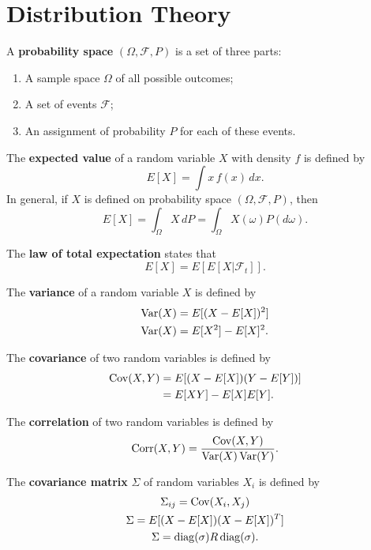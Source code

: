 \documentclass[10pt]{article}
\begin{document}
\section{Distribution Theory}

\begin{outline}
\1 A \textbf{probability space} $(\Omega, \mathscr{F}, P)$ is a set of three parts:
\begin{enumerate}
\item A sample space $\Omega$ of all possible outcomes;
\item A set of events $\mathscr{F}$;
\item An assignment of probability $P$ for each of these events.
\end{enumerate}

\1 The \textbf{expected value} of a random variable $X$ with density $f$ is defined by
\begin{equation*}
  E[X] = \int x\,f(x)\,dx.
\end{equation*}
In general, if $X$ is defined on probability space $(\Omega,\mathscr{F},P)$, then 
\begin{equation*}
  E[X] = \int_\Omega X\,dP = \int_\Omega X(\omega)P(d\omega).
\end{equation*}

\1 The \textbf{law of total expectation} states that
\begin{equation*}
  E[X] = E[E[X|\mathscr{F}_t]].
\end{equation*}

\1 The \textbf{variance} of a random variable $X$ is defined by
\begin{align*}
  \operatorname{Var}(X) &= E[(X-E[X])^2]\\
  \operatorname{Var}(X) &= E[X^2] - E[X]^2.
\end{align*}

\1 The \textbf{covariance} of two random variables is defined by
\begin{align*}
  \operatorname{Cov}(X,Y) &= E[(X-E[X])(Y-E[Y])]\\
            &= E[XY] - E[X]E[Y].
\end{align*}

\1 The \textbf{correlation} of two random variables is defined by
\begin{equation*}
  \operatorname{Corr}(X,Y) = \frac{\operatorname{Cov}(X,Y)}{\operatorname{Var}(X)\operatorname{Var}(Y)}.
\end{equation*}

\1 The \textbf{covariance matrix} $\Sigma$ of random variables $X_i$ is defined by
\begin{gather*}
  \Sigma_{ij} = \operatorname{Cov}(X_i,X_j)\\
  \Sigma = E[(X-E[X])(X-E[X])^T]\\
  \Sigma = \operatorname{diag}(\sigma)R\operatorname{diag}(\sigma).
\end{gather*}


\end{outline}
\end{document}
